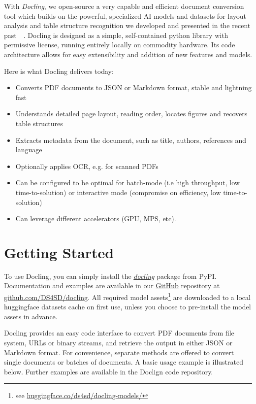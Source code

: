\documentclass{article}
\begin{document}
With \textit{Docling}, we open-source a very capable and efficient document conversion tool which builds on the powerful, specialized AI models and datasets for layout analysis and table structure recognition we developed and presented in the recent past~~\cite{tableformer, dln, lysak_optimized_2023}. Docling is designed as a simple, self-contained python library with permissive license, running entirely locally on commodity hardware. Its code architecture allows for easy extensibility and addition of new features and models. 

\pagebreak
Here is what Docling delivers today:

\begin{itemize}
    \item Converts PDF documents to JSON or Markdown format, stable and lightning fast
    \item Understands detailed page layout, reading order, locates figures and recovers table structures
    \item Extracts metadata from the document, such as title, authors, references and language
    \item Optionally applies OCR, e.g. for scanned PDFs
    \item Can be configured to be optimal for batch-mode (i.e high throughput, low time-to-solution) or interactive mode (compromise on efficiency, low time-to-solution)
    \item Can leverage different accelerators (GPU, MPS, etc).
\end{itemize}


\section{Getting Started}

To use Docling, you can simply install the \textit{\href{https://pypi.org/project/docling/}{docling}} package from PyPI. Documentation and examples are available in our \href{https://github.ibm.com/DS4SD/docling}{GitHub} repository at \href{https://github.com/DS4SD/docling}{github.com/DS4SD/docling}. All required model assets\footnote{see \href{https://huggingface.co/ds4sd/docling-models/}{huggingface.co/ds4sd/docling-models/}} are downloaded to a local huggingface datasets cache on first use, unless you choose to pre-install the model assets in advance.

Docling provides an easy code interface to convert PDF documents from file system, URLs or binary streams, and retrieve the output in either JSON or Markdown format. For convenience, separate methods are offered to convert single documents or batches of documents. A basic usage example is illustrated below. Further examples are available in the Doclign code repository.
\end{document}
